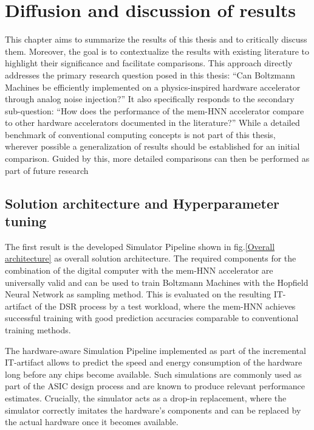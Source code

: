 \chapter{Diffusion and discussion of results}

This chapter aims to summarize the results of this thesis and to critically discuss them.
Moreover, the goal is to contextualize the results with existing literature to highlight their significance and facilitate comparisons.
This approach directly addresses the primary research question posed in this thesis: ``Can Boltzmann Machines be efficiently implemented on a physics-inspired hardware accelerator through analog noise injection?''
It also specifically responds to the secondary sub-question: ``How does the performance of the \ac{mem-HNN} accelerator compare to other hardware accelerators documented in the literature?''
While a detailed benchmark of conventional computing concepts is not part of this thesis, wherever possible a generalization of results should be established for an initial comparison.
Guided by this, more detailed comparisons can then be performed as part of future research

\section{Solution architecture and Hyperparameter tuning}

The first result is the developed Simulator Pipeline shown in fig.\ref{Overall architecture} as overall solution architecture. 
The required components for the combination of the digital computer with the \ac{mem-HNN} accelerator 
are universally valid and can be used to train Boltzmann Machines with the Hopfield Neural Network as sampling method. 
This is evaluated on the resulting \ac{IT}-artifact of the \ac{DSR} process by a test workload, where the \ac{mem-HNN}
achieves successful training with good prediction accuracies comparable to conventional training methods. 

The hardware-aware Simulation Pipeline implemented as part of the incremental \ac{IT}-artifact allows to predict the speed and energy consumption of the hardware long before any chips become available.
Such simulations are commonly used as part of the \ac{ASIC} design process and are known to produce relevant performance estimates.
Crucially, the simulator acts as a drop-in replacement, where the simulator correctly imitates the hardware's components and can be replaced by the actual hardware once it becomes available.

